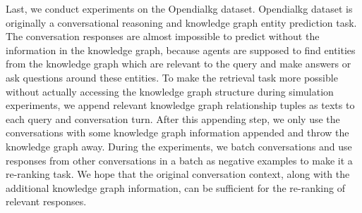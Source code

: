 \documentclass[format=acmsmall, review=False, screen=true]{acmart}
\begin{document}
Last, we conduct experiments on the Opendialkg dataset. Opendialkg dataset is originally a conversational reasoning and knowledge graph entity prediction task. The conversation responses are almost impossible to predict without the information in the knowledge graph, because agents are supposed to find entities from the knowledge graph which are relevant to the query and make answers or ask questions around these entities. To make the retrieval task more possible without actually accessing the knowledge graph structure during simulation experiments, we append relevant knowledge graph relationship tuples as texts to each query and conversation turn. After this appending step, we only use the conversations with some knowledge graph information appended and throw the knowledge graph away. During the experiments, we batch conversations and use responses from other conversations in a batch as negative examples to make it a re-ranking task. We hope that the original conversation context, along with the additional knowledge graph information, can be sufficient for the re-ranking of relevant responses.
\end{document}
